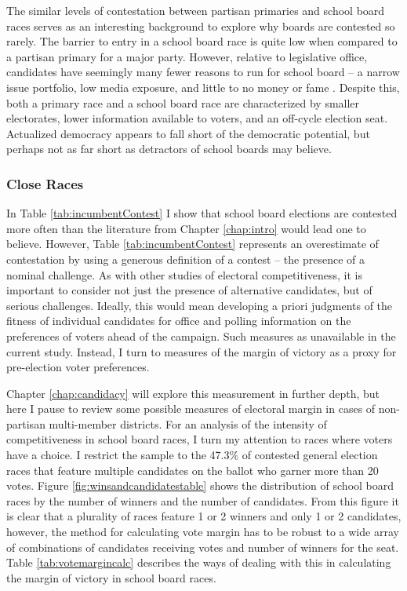 The similar levels of contestation between partisan primaries and school board 
races serves as an interesting background to explore why boards are contested 
so rarely. The barrier to entry in a school board race is quite low when compared to a 
partisan primary for a major party. However, relative to legislative office, candidates 
have seemingly many fewer reasons to run for school board -- a narrow issue portfolio, 
low media exposure, and little to no money or fame \citep{RefWorks:321,RefWorks:322}. 
Despite this, both a primary race and a school board race are characterized by 
smaller electorates, lower information available to voters, and an off-cycle election 
seat. Actualized democracy appears to fall short of the democratic potential, but 
perhaps not as far short as detractors of school boards may believe. 

\subsubsection{Close Races}
\label{subsec:closeraces}

In Table \ref{tab:incumbentContest} I show that school board elections are 
contested more often than the literature from Chapter \ref{chap:intro} would lead 
one to believe. However, Table \ref{tab:incumbentContest} represents an overestimate 
of contestation by using a generous definition of a contest -- the presence of a 
nominal challenge. As with other studies of electoral competitiveness, it is 
important to consider not just the presence of alternative candidates, but of 
serious challenges. Ideally, 
this would mean developing a priori judgments of the fitness of individual candidates 
for office and polling information on the preferences of voters ahead of the 
campaign. Such measures as unavailable in the current study. Instead, I turn to 
measures of the margin of victory as a proxy for pre-election voter preferences. 





Chapter \ref{chap:candidacy} will explore this measurement in further depth, but here 
I pause to review some possible measures of electoral margin in cases of non-partisan 
multi-member districts. For an analysis of the intensity of competitiveness in 
school board races, I turn my attention to races where voters have a choice. I 
restrict the sample to the 47.3\% of contested general election races that feature multiple candidates 
on the ballot who garner more than 20 votes. Figure 
\ref{fig:winsandcandidatestable} shows the distribution of school board 
races by the number of winners and the number of candidates. From this figure 
it is clear that a plurality of races feature 1 or 2 winners and only 1 or 
2 candidates, however, the method for calculating vote margin has to be robust to a wide 
array of combinations of candidates receiving votes and number of winners for the 
seat. Table \ref{tab:votemargincalc} describes the ways of dealing with this in 
calculating the margin of victory in school board races.

